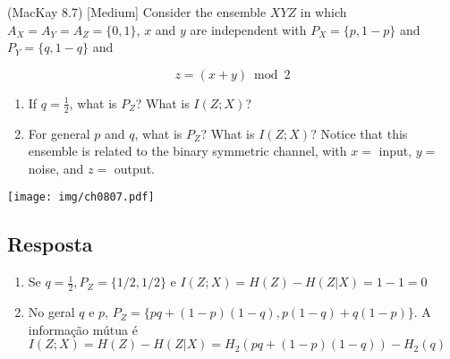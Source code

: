 (MacKay 8.7) [Medium]
Consider the ensemble $XYZ$ in which $A_X = A_Y = A_Z = \{0, 1\}$, $x$ and $y$ are independent with $P_X = \{p, 1-p\}$ and $P_Y = \{q, 1-q\}$ and

\[z = (x + y) \bmod 2\]

\begin{enumerate}
	\item If $\displaystyle q = \frac{1}{2}$, what is $P_Z$? What is $I(Z; X)$?
	\item For general $p$ and $q$, what is $P_Z$? What is $I(Z;X)$? Notice that this ensemble is related to the binary symmetric channel, with $x =$ input, $y =$ noise, and $z =$ output.
\end{enumerate}

\begin{center}
    \texttt{[image: img/ch0807.pdf]}    
\end{center}

\subsection*{Resposta}

\begin{enumerate}
    \item 
    Se $q=\frac{1}{2}, P_Z=\{1/2, 1/2\}$ e $I(Z;X) = H(Z) - H(Z|X) = 1 - 1 = 0$
    \bigskip
    
    \item
    No geral $q$ e $p$, $P_Z = \{pq + (1-p)(1-q), p(1-q) + q(1-p)\}$. A informação mútua é $I(Z; X) = H(Z) - H(Z|X) = H_2(pq+(1-p)(1-q)) - H_2(q)$ 
    \bigskip
\end{enumerate}